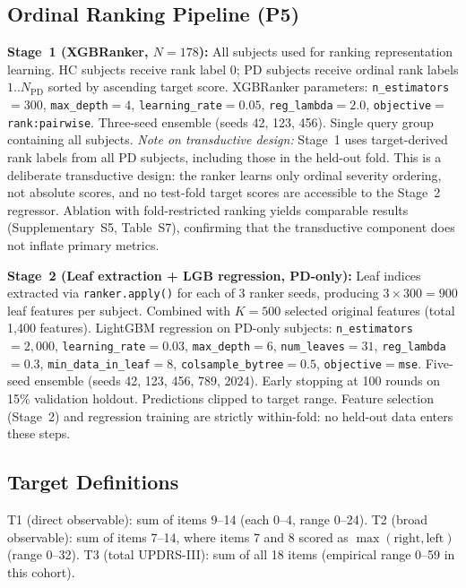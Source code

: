 \documentclass[11pt,a4paper]{article}
\begin{document}
\subsection{Ordinal Ranking Pipeline (P5)}

\textbf{Stage~1 (XGBRanker, $N=178$):} All subjects used for ranking representation learning. HC subjects receive rank label 0; PD subjects receive ordinal rank labels $1..N_{\mathrm{PD}}$ sorted by ascending target score. XGBRanker parameters: \texttt{n\_estimators}$=300$, \texttt{max\_depth}$=4$, \texttt{learning\_rate}$=0.05$, \texttt{reg\_lambda}$=2.0$, \texttt{objective}$=$\texttt{rank:pairwise}. Three-seed ensemble (seeds 42, 123, 456). Single query group containing all subjects. \emph{Note on transductive design:} Stage~1 uses target-derived rank labels from all PD subjects, including those in the held-out fold. This is a deliberate transductive design: the ranker learns only ordinal severity ordering, not absolute scores, and no test-fold target scores are accessible to the Stage~2 regressor. Ablation with fold-restricted ranking yields comparable results (Supplementary~S5, Table~S7), confirming that the transductive component does not inflate primary metrics.

\textbf{Stage~2 (Leaf extraction + LGB regression, PD-only):} Leaf indices extracted via \texttt{ranker.apply()} for each of 3 ranker seeds, producing $3\times 300=900$ leaf features per subject. Combined with $K=500$ selected original features (total 1{,}400 features). LightGBM regression on PD-only subjects: \texttt{n\_estimators}$=2{,}000$, \texttt{learning\_rate}$=0.03$, \texttt{max\_depth}$=6$, \texttt{num\_leaves}$=31$, \texttt{reg\_lambda}$=0.3$, \texttt{min\_data\_in\_leaf}$=8$, \texttt{colsample\_bytree}$=0.5$, \texttt{objective}$=$\texttt{mse}. Five-seed ensemble (seeds 42, 123, 456, 789, 2024). Early stopping at 100 rounds on 15\% validation holdout. Predictions clipped to target range. Feature selection (Stage~2) and regression training are strictly within-fold: no held-out data enters these steps.

\subsection{Target Definitions}

T1 (direct observable): sum of items 9--14 (each 0--4, range 0--24). T2 (broad observable): sum of items 7--14, where items 7 and 8 scored as $\max(\text{right}, \text{left})$ (range 0--32). T3 (total UPDRS-III): sum of all 18 items (empirical range 0--59 in this cohort).
\end{document}
